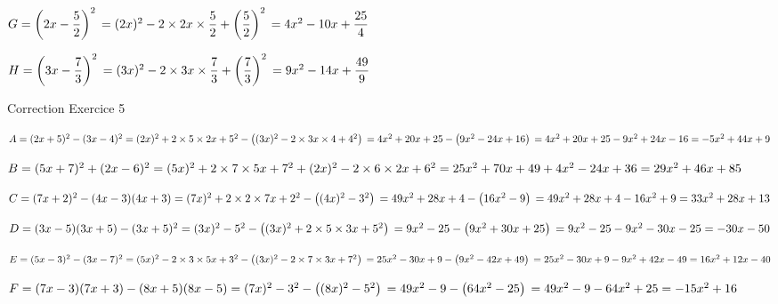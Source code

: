 $ G=\left(2x-\dfrac{5}{2}\right)^2 \\
=(2x)^2-2\times 2x\times \dfrac{5}{2}+\left(\dfrac{5}{2}\right)^2 \\
=4x^2-10x+\dfrac{25}{4}
$

$H=\left(3x-\dfrac{7}{3}\right)^2 \\
=(3x)^2-2\times 3x\times \dfrac{7}{3}+\left(\dfrac{7}{3}\right)^2 \\
=9x^2-14x+\dfrac{49}{9}
$

Correction Exercice 5

$A=(2x+5)^2-(3x-4)^2\\
=(2x)^2+2\times 5\times 2x+5^2-\left((3x)^2-2\times 3x\times 4+ 4^2\right) \\
=4x^2+20x+25-\left(9x^2-24x+16\right) \\
=4x^2+20x+25-9x^2+24x-16\\
=-5x^2+44x+9$

$B=(5x+7)^2+(2x-6)^2\\
=(5x)^2+2\times 7\times 5x+7^2+(2x)^2-2\times 6\times 2x+6^2\\
=25x^2+70x+49+4x^2-24x+36\\
=29x^2+46x+85$

$C=(7x+2)^2-(4x-3)(4x+3) \\
=(7x)^2+2\times 2\times 7x+2^2-\left((4x)^2-3^2\right) \\
=49x^2+28x+4-\left(16x^2-9\right) \\
=49x^2+28x+4-16x^2+9\\
=33x^2+28x+13$

$D=(3x-5)(3x+5)-(3x+5)^2\\
=(3x)^2-5^2-\left((3x)^2+2\times 5\times 3x+5^2\right) \\
=9x^2-25-\left(9x^2+30x+25\right) \\
=9x^2-25-9x^2-30x-25\\
=-30x-50$

$E=(5x-3)^2-(3x-7)^2\\
=(5x)^2-2\times 3\times 5x+3^2-\left((3x)^2-2\times 7\times 3x+7^2\right) \\
=25x^2-30x+9-\left(9x^2-42x+49\right) \\
=25x^2-30x+9-9x^2+42x-49\\
=16x^2+12x-40$

$F=(7x-3)(7x+3)-(8x+5)(8x-5) \\
=(7x)^2-3^2-\left((8x)^2-5^2\right) \\
=49x^2-9-\left(64x^2-25\right) \\
=49x^2-9-64x^2+25\\
=-15x^2+16
$

